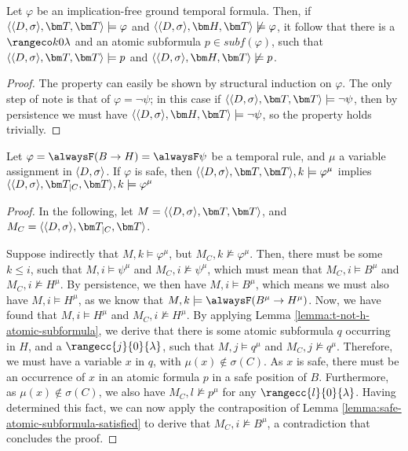\begin{lemma}\label{lemma:t-not-h-atomic-subformula}
  Let $\varphi$ be an implication-free ground temporal formula. Then,
  if $\qttandt \models \varphi$ and $\qthandt \not\models \varphi$, it
  follow that there is a $\kinlambda$ and an atomic subformula
  $p \in subf(\varphi)$, such that $\qttandt \models p$ and
  $\qthandt \not\models p$.
\end{lemma}
\begin{proof}
  The property can easily be shown by structural induction on
  $\varphi$. The only step of note is that of $\varphi = \neg \psi$;
  in this case if $\qttandt \models \neg \psi$, then by
  persistence we must have $\qthandt \models \neg \psi$, so the
  property holds trivially.
\end{proof}



\begin{lemma}
  Let $\varphi=\alwaysF (B \rightarrow H)=\alwaysF \psi$ be a temporal
  rule, and $\mu$ a variable assignment in $\langle D, \sigma \rangle$. If $\varphi$ is
  safe, then $\qttandt,k \models \varphi^\mu$ implies
  $\qttcandt,k \models \varphi^\mu$
\end{lemma}
\begin{proof}
  In the following, let $M=\qttandt$, and $M_C=\qttcandt$.

  Suppose indirectly that $M,k \models \varphi^\mu$, but
  $M_C,k \not \models \varphi^\mu$. Then, there must be some
  $k\leq i$, such that $M,i \models \psi^\mu$ and
  $M_C,i \not \models \psi^\mu$, which must mean that
  $M_C,i \models B^\mu$ and $M_C,i \not \models H^\mu$. By
  persistence, we then have $M,i \models B^\mu$, which means we must
  also have $M,i \models H^\mu$, as we know that
  $M,k \models \alwaysF(B^\mu \rightarrow H^\mu)$. Now, we have found
  that $M,i \models H^\mu$ and $M_C,i \not \models H^\mu$. By applying
  Lemma \ref{lemma:t-not-h-atomic-subformula}, we derive that there is some atomic subformula
  $q$ occurring in $H$, and a $\rangecc{j}{0}{\lambda}$, such that
  $M,j \models q^\mu$ and $M_C,j \not \models q^\mu$. Therefore, we
  must have a variable $x$ in $q$, with $\mu(x) \not \in
  \sigma(C)$. As $x$ is safe, there must be an occurrence of $x$ in an
  atomic formula $p$ in a safe position of $B$. Furthermore, as
  $\mu(x) \not \in \sigma(C)$, we also have $M_C,l \not \models p^\mu$
  for any $\rangecc{l}{0}{\lambda}$. Having determined this fact, we
  can now apply the contraposition of Lemma \ref{lemma:safe-atomic-subformula-satisfied} to derive
  that $M_C,i \not \models B^\mu$, a contradiction that concludes the
  proof.
\end{proof}

